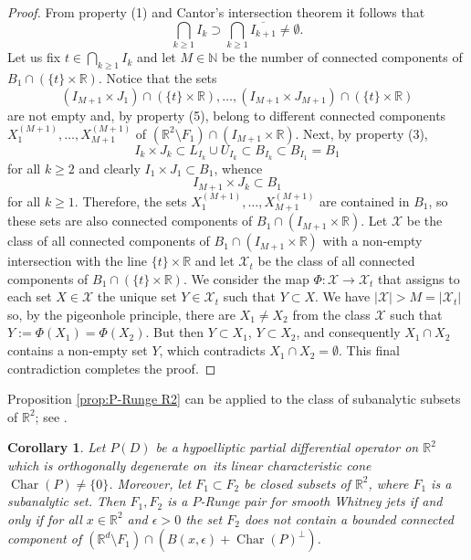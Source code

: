 \documentclass[a4paper,10pt]{amsart}
\newtheorem{corollary}[theorem]{Corollary}
\newtheorem*{crucial lemma}{Lemma \ref{lem:nice polynomial2}}
\theoremstyle{definition}
\newcommand{\R}{\mathbb{R}}
\newcommand{\N}{\mathbb{N}}
\newcommand{\charcone}{\operatorname{Char}}
\newcommand{\veryniceon}[1]{orthogonally degenerate on~#1}
\begin{document}
\begin{proof}
From property (1) and Cantor's intersection theorem it follows that 
\[\bigcap_{k\geq 1}I_k\supset\bigcap_{k\geq 1}\overline{I_{k+1}}\neq\emptyset.\]
Let us fix $t\in \bigcap_{k\geq 1} I_k$ and let $M\in\N$ be the number of connected components of $B_1\cap (\{t\}\times\R)$. Notice that the sets
\[(I_{M+1}\times J_1)\cap (\{t\}\times\R),\ldots,(I_{M+1}\times J_{M+1})\cap (\{t\}\times\R) \]
are not empty and, by property (5), belong to different connected components $X_1^{(M+1)},\ldots, X_{M+1}^{(M+1)}$ of $(\R^2\setminus F_1)\cap (I_{M+1}\times\R)$. Next, by property (3), 
\[I_k\times J_k\subset L_{I_k}\cup U_{I_k}\subset B_{I_k}\subset B_{I_1}=B_1\]
for all $k\geq 2$ and clearly $I_1\times J_1\subset B_1$, whence
\[I_{M+1}\times J_k\subset B_1\]
for all $k\geq 1$. Therefore,  
the sets $X_1^{(M+1)},\ldots, X_{M+1}^{(M+1)}$ are contained in $B_1$, so these sets are also connected components of $B_1\cap (I_{M+1}\times\R)$.
Let $\mathcal{X}$ be the class of all connected components of $B_1\cap (I_{M+1}\times\R)$ with a non-empty intersection with the line $\{t\}\times\R$ and let $\mathcal{X}_t$ be the class of all connected components of $B_1\cap (\{t\}\times\R)$.
We consider the map $\Phi\colon\mathcal{X}\to\mathcal{X}_t$ that assigns to each set $X\in\mathcal{X}$ the unique set $Y\in\mathcal{X}_t$ such that $Y\subset X$. We have $|\mathcal{X}|> M=|\mathcal{X}_t|$ so, by the pigeonhole principle, there are $X_1\neq X_2$ from the class $\mathcal{X}$ such that $Y:=\Phi(X_1)=\Phi(X_2)$. But then $Y\subset X_1$, $Y\subset X_2$, and consequently $X_1\cap X_2$  contains a non-empty set $Y$, which contradicts $X_1\cap X_2=\emptyset$. This final contradiction completes the proof.
\end{proof}

Proposition \ref{prop:P-Runge R2} can be applied to the class of subanalytic subsets of $\R^2$; see \cite[Definition 3.1]{BierstoneMilman1988}.
\begin{corollary}
Let $P(D)$ be a hypoelliptic partial differential operator on $\R^2$ which is \veryniceon{its linear characteristic cone} $\charcone(P)\neq \{0\}$. Moreover, let $F_1\subset F_2$ be closed subsets of $\R^2$, where $F_1$ is a subanalytic set.  Then $F_1,F_2$ is a $P$-Runge pair for smooth Whitney jets if and only if for all $x\in\R^2$ and $\epsilon>0$ the set $F_2$ does not contain a bounded connected component of $(\R^d\setminus F_1)\cap (B(x,\epsilon)+\charcone(P)^\perp)$.
\end{corollary}
\end{document}
